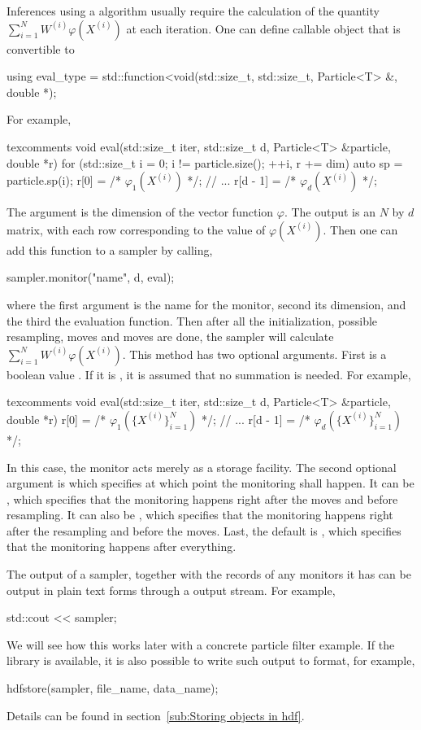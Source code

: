 Inferences using a \smc algorithm usually require the calculation of the
quantity $\sum_{i=1}^NW^{(i)}\varphi(X^{(i)})$ at each iteration. One can
define callable object that is convertible to
\begin{cppcode}
  using eval_type =
  std::function<void(std::size_t, std::size_t, Particle<T> &, double *);
\end{cppcode}
For example,
\begin{cppcode*}{texcomments}
  void eval(std::size_t iter, std::size_t d, Particle<T> &particle, double *r)
  {
    for (std::size_t i = 0; i != particle.size(); ++i, r += dim) {
      auto sp = particle.sp(i);
      r[0] = /* $\varphi_1(X^{(i)})$ */;
      // ...
      r[d - 1] = /* $\varphi_d(X^{(i)})$ */;
    }
  }
\end{cppcode*}
The argument  is the dimension of the vector function $\varphi$.
The output is an $N$ by $d$ matrix, with each row corresponding to the value of
$\varphi(X^{(i)})$. Then one can add this function to a sampler by calling,
\begin{cppcode}
  sampler.monitor("name", d, eval);
\end{cppcode}
where the first argument is the name for the monitor, second its dimension, and
the third the evaluation function. Then after all the initialization, possible
resampling, moves and \mcmc moves are done, the sampler will calculate
$\sum_{i=1}^NW^{(i)}\varphi(X^{(i)})$. This method has two optional arguments.
First is a boolean value . If it is , it
is assumed that no summation is needed. For example,
\begin{cppcode*}{texcomments}
  void eval(std::size_t iter, std::size_t d, Particle<T> &particle, double *r)
  {
    r[0] = /* $\varphi_1(\{X^{(i)}\}_{i=1}^N)$ */;
    // ...
    r[d - 1] = /* $\varphi_d(\{X^{(i)}\}_{i=1}^N)$ */;
  }
\end{cppcode*}
In this case, the monitor acts merely as a storage facility. The second
optional argument is  which specifies at which point the
monitoring shall happen. It can be , which specifies
that the monitoring happens right after the moves and before resampling. It can
also be , which specifies that the monitoring
happens right after the resampling and before the \mcmc moves. Last, the
default is , which specifies that the monitoring happens
after everything.

The output of a sampler, together with the records of any monitors it has can
be output in plain text forms through a \cpp output stream. For example,
\begin{cppcode}
  std::cout << sampler;
\end{cppcode}
We will see how this works later with a concrete particle filter example. If
the \hdf library is available, it is also possible to write such output to \hdf
format, for example,
\begin{cppcode}
  hdfstore(sampler, file_name, data_name);
\end{cppcode}
Details can be found in section~\ref{sub:Storing objects in hdf}.

